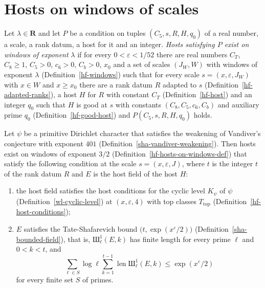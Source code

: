 \section{Hosts on windows of scales}\label{section-hf-windows-hosts}

\begin{definition}\label{hf-hosts-on-windows-def}
Let $\lambda\in\mathbf R$ and let $P$ be a condition on tuples $(C_5,s,R,H,q_0)$ of a real number, a scale,
a rank datum, a host for it and an integer. \emph{Hosts satisfying $P$ exist on windows of exponent}
$\lambda$ if for every $0<\varepsilon<1/52$ there are real numbers $C_T$, $C_8\geq1$, $C_5>0$,
$c_6>0$, $C_b>0$, $x_0$ and a set of scales $(J_W,W)$ with windows of exponent $\lambda$
(Definition~\ref{hf-windows}) such that for every scale $s=(x,\varepsilon,J_W)$ with $x\in W$ and
$x\geq x_0$ there are a rank datum $R$ adapted to $s$ (Definition~\ref{hf-adapted-ranks}), a host $H$ for
$R$ with constant $C_T$ (Definition~\ref{hf-host}) and an integer $q_0$ such that $H$ is good at
$s$ with constants $(C_8,C_5,c_6,C_b)$ and auxiliary prime $q_0$ (Definition~\ref{hf-good-host})
and $P(C_5,s,R,H,q_0)$ holds.
\end{definition}

\begin{theorem}\label{hf-hosts-on-windows}
Let $\psi$ be a primitive Dirichlet character that satisfies the weakening of Vandiver's conjecture
with exponent $401$ (Definition~\ref{sha-vandiver-weakening}). Then hosts exist on windows of exponent
$3/2$ (Definition~\ref{hf-hosts-on-windows-def}) that satisfy the following condition at the scale
$s=(x,\varepsilon,J)$, where $t$ is the integer $t$ of the rank datum $R$ and $E$ is the host field
of the host $H$:
\begin{enumerate}
\item the host field satisfies the host conditions for the cyclic level $K_\psi$ of $\psi$
  (Definition~\ref{wl-cyclic-level}) at $(x,\varepsilon,4)$ with top classes $T_{\mathrm{top}}$
  (Definition~\ref{hf-host-conditions});
\item $E$ satisfies the Tate-Shafarevich bound $\bigl(t,\exp(x^{\varepsilon}/2)\bigr)$
  (Definition~\ref{sha-bounded-field}), that is, $\text{Ш}^1_\ell(E,k)$ has finite length for every
  prime $\ell$ and $0<k<t$, and
  \[
   \sum_{\ell\in S}\log\ell\sum_{k=1}^{t-1}\operatorname{len}\text{Ш}^1_\ell(E,k)\leq
   \exp(x^{\varepsilon}/2)
  \]
  for every finite set $S$ of primes.
\end{enumerate}
\end{theorem}

